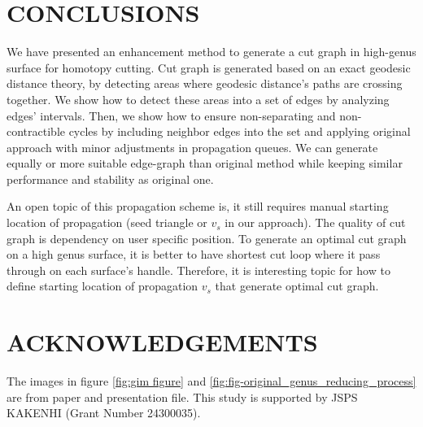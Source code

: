 \documentclass[a4paper,twoside]{article}
\begin{document}
\section{\uppercase{Conclusions}}
\label{sec:conclusion}

\noindent We have presented an enhancement method to generate a cut graph in high-genus surface for homotopy cutting. Cut graph is generated based on an exact geodesic distance theory, by detecting areas where geodesic distance's paths are crossing together. We show how to detect these areas into a set of edges by analyzing edges' intervals. Then, we show how to ensure non-separating and non-contractible cycles by including neighbor edges into the set and applying original approach with minor adjustments in propagation queues. We can generate equally or more suitable edge-graph than original method while keeping similar performance and stability as original one.

An open topic of this propagation scheme is, it still requires manual starting location of propagation (seed triangle or $v_s$ in our approach). The quality of cut graph is dependency on user specific position.  To generate an optimal cut graph on a high genus surface, it is better to have shortest cut loop where it pass through on each surface's handle. Therefore, it is interesting topic for how to define starting location of propagation $v_s$ that generate optimal cut graph.


\section*{\uppercase{Acknowledgements}}
\noindent The images in figure \ref{fig:gim figure} and \ref{fig:fig-original_genus_reducing_process}  are from \cite{Gu:2002:GI:566654.566589} paper and presentation file. This study is supported by JSPS KAKENHI (Grant Number 24300035).




{\small
}
\vfill
\end{document}
